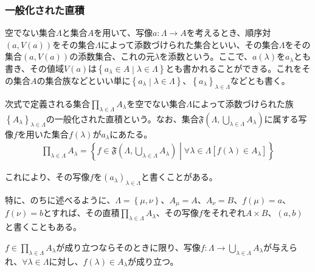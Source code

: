 \documentclass[a4paper]{jsarticle}
\begin{document}
\subsubsection{一般化された直積}%
\begin{dfn}
空でない集合$\varLambda$と集合$A$を用いて、写像$a:\varLambda \rightarrow A$を考えるとき、順序対$\left( a,V(a) \right)$をその集合$\varLambda$によって添数づけられた集合といい、その集合$\varLambda$をその集合$\left( a,V(a) \right)$の添数集合、これの元$\lambda$を添数という。ここで、$a(\lambda)$を$a_{\lambda}$とも書き、その値域$V(a)$は$\left\{ a_{\lambda} \in A \middle| \lambda \in \varLambda \right\}$とも書かれることができる。これをその集合$A$の集合族などといい単に$\left\{ a_{\lambda} \middle| \lambda \in \varLambda \right\}$、$\left\{ a_{\lambda} \right\}_{\lambda \in \varLambda}$などとも書く。
\end{dfn}
\begin{dfn}
次式で定義される集合$\prod_{\lambda \in \varLambda} A_{\lambda}$を空でない集合$\varLambda$によって添数づけられた族$\left\{ A_{\lambda} \right\}_{\lambda \in \varLambda}$の一般化された直積という。なお、集合$\mathfrak{F}\left( \varLambda,\bigcup_{\lambda \in \varLambda} A_{\lambda} \right)$に属する写像$f$を用いた集合$f(\lambda)$が$a_{\lambda}$にあたる。
\begin{align*}
\prod_{\lambda \in \varLambda} A_{\lambda} = \left\{ f \in \mathfrak{F}\left( \varLambda,\bigcup_{\lambda \in \varLambda} A_{\lambda} \right) \middle| \forall\lambda \in \varLambda\left[ f(\lambda) \in A_{\lambda} \right] \right\}
\end{align*}
\end{dfn}
これにより、その写像$f$を$\left( a_{\lambda} \right)_{\lambda \in \varLambda}$と書くことがある。\par
特に、のちに述べるように、$\varLambda = \left\{ \mu,\nu \right\}$、$A_{\mu} = A$、$A_{\nu} = B$、$f(\mu) = a$、$f(\nu) = b$とすれば、その直積$\prod_{\lambda \in \varLambda} A_{\lambda}$、その写像$f$をそれぞれ$A \times B$、$(a,b)$と書くこともある。
\begin{thm}
\label{1.2.1.19}
$f \in \prod_{\lambda \in \varLambda} A_{\lambda}$が成り立つならそのときに限り、写像$f:\varLambda \rightarrow \bigcup_{\lambda \in \varLambda} A_{\lambda}$が与えられ、$\forall\lambda \in \varLambda$に対し、$f(\lambda) \in A_{\lambda}$が成り立つ。
\end{thm}
\end{document}
